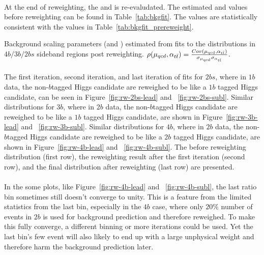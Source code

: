 \paragraph{}
At the end of reweighting, the \muqcd and \alphatt is re-evaludated. The estimated \muqcd and \alphatt values before reweighting can be found in Table~\ref{tab:bkgfit}. 
The values are statistically consistent with the values in Table~\ref{tab:bkgfit_prereweight}. 

\begin{table}[htbp!]
\begin{center}
\caption{Background scaling parameters (\muqcd and \alphatt) estimated from fits to the \mleadJ distributions in $4b/3b/2bs$ sideband regions post reweighting. $\rho(\mu_{qcd},\alpha_{t\bar{t}}) = \frac{Cov(\rm \mu_{qcd},\rm \alpha_{\rm t\bar{t}})}{\rm \sigma_{\mu_{qcd}} \rm \sigma_{\alpha_{\rm t\bar{t}}} }$.}

\label{tab:bkgfit}
\end{center}
\end{table}

\paragraph{}
The first iteration, second iteration, and last iteration of fits for $2bs$, where in $1b$ data, the non-$b$tagged Higgs candidate are reweighed to be like a $1b$ tagged Higgs candidate, can be seen in Figure~\ref{fig:rw-2bs-lead} and ~\ref{fig:rw-2bs-subl}. 
Similar distributions for $3b$, where in $2b$ data, the non-$b$tagged Higgs candidate are reweighed to be like a $1b$ tagged Higgs candidate, are shown in Figure~\ref{fig:rw-3b-lead} and ~\ref{fig:rw-3b-subl}. 
Similar distributions for $4b$, where in $2b$ data, the non-$b$tagged Higgs candidate are reweighed to be like a $2b$ tagged Higgs candidate, are shown in Figure~\ref{fig:rw-4b-lead} and ~\ref{fig:rw-4b-subl}. 
The before reweighting distribution (first row), the reweighting result after the first iteration (second row), and the final distribution after reweighting (last row) are presented.

\paragraph{}
In the some plots, like Figure~\ref{fig:rw-4b-lead} and ~\ref{fig:rw-4b-subl}, the last ratio bin sometimes still doesn't converge to unity. 
This is a feature from the limited statistics from the last bin, especially in the $4b$ case, where only $20\%$ number of events in $2b$ is used for background prediction and therefore reweighed.
To make this fully converge, a different binning or more iterations could be used.
Yet the last bin's few event will also likely to end up with a large unphysical weight and therefore harm the background prediction later.

